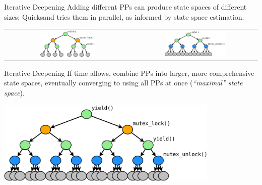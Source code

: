 \documentclass[xcolor=dvipsnames]{beamer}
\begin{document}
\begin{frame}{Iterative Deepening}
	Adding different PPs can produce state spaces of different sizes; Quicksand tries them in parallel, as informed by state space estimation.
	\vspace{0.15in}
	\begin{center}
		\begin{tabular}{cc}
			\includegraphics[width=0.45\textwidth]{tree1.pdf} &
			\includegraphics[width=0.5\textwidth]{tree2.pdf}
		\end{tabular}
	\end{center}
\end{frame}


\begin{frame}{Iterative Deepening}
	If time allows, combine PPs into larger, more comprehensive state spaces, eventually converging to using all PPs at once ({\em ``maximal'' state space}).
	\begin{center}
		\includegraphics[width=0.8\textwidth]{tree3.pdf}
	\end{center}
\end{frame}
\end{document}
